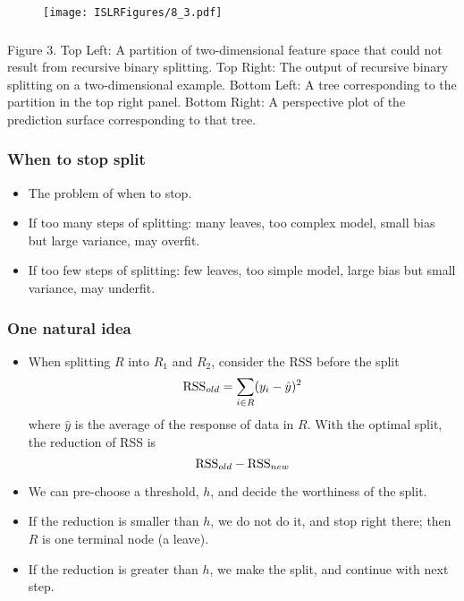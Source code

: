 \documentclass{beamer}
\begin{document}
   \begin{frame}
   	\frametitle{ }
   	\begin{figure}
   		\centering
   		
   		\centering
   		\texttt{[image: ISLRFigures/8\_3.pdf]}
   		 	\end{figure}
   		 \end{frame}
   		 
   		  \begin{frame}
   		  	\frametitle{ } 
   		  	
   		  	
   		 Figure 3. Top Left: A partition of two-dimensional feature space that could
   			not result from recursive binary splitting. Top Right: The output of recursive
   			binary splitting on a two-dimensional example. Bottom Left: A tree corresponding
   			to the partition in the top right panel. Bottom Right: A perspective plot of the
   			prediction surface corresponding to that tree.
   		 
   
   \end{frame}
   
    \begin{frame}
    	\frametitle{ When to stop split}
    	\begin{itemize}	
    		\item The problem of when to stop.
    		\item If too many steps of splitting: many leaves, too complex model, small bias but large variance, 
    		may overfit.
    		\item If too few steps of splitting: few leaves,  too simple model, large bias but small variance,
    		may underfit.
    		
    		
    	 
    		 
    	\end{itemize}
    \end{frame} 
    
 
     \begin{frame}
     	\frametitle{ One natural idea}
     	\begin{itemize}	
     		\item  When splitting $R$ into $R_1$ and $R_2$,
     		consider  the RSS before the split
     		$$ \hbox{RSS}_{old} = \sum_{i \in R} (y_i - \hat y)^2$$
     		where $\hat y$ is the average of the response of data in $R$.
     		With the optimal split, the reduction of RSS 
     		is $$ \hbox{RSS}_{old} -\hbox{RSS}_{new}$$
     		\item We can pre-choose a threshold, $h$, and decide the worthiness of 
     		the split.
     		\item If the reduction is smaller than $h$, we do not do it, and stop right there; then $R$ is one terminal node (a leave).
     		\item If the reduction is greater than $h$, we make the split, and continue with next step.  
     	 
     	\end{itemize}
     \end{frame} 
     
\end{document}
